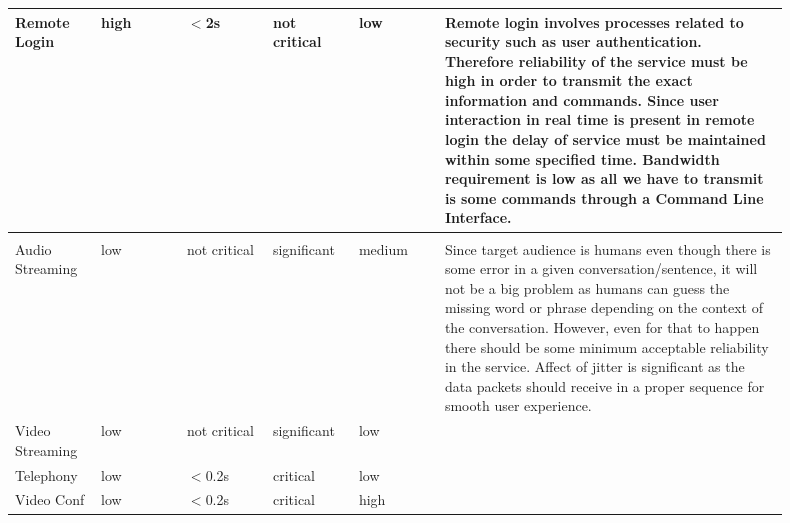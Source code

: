 \documentclass[a4paper,11pt]{article}
\begin{document}
\begin{landscape}
\begin{longtable}{p{0.1\linewidth} | p{0.1\linewidth} | p{0.1\linewidth} | p{0.1\linewidth} | p{0.1\linewidth} | p{0.4\linewidth} }
	Remote Login& high	& $<$2s & not critical & low & 
	Remote login involves  processes  related to security such as user authentication. Therefore reliability of the service must be high in order to transmit the exact information and commands. Since user interaction in real time is present in remote login the delay of service must be  maintained within some specified time. Bandwidth requirement is low as all we have to transmit is some commands through a Command Line Interface. \\\hline
	&&&&&\\
	
	Audio Streaming & low 	& not critical 	& significant & medium & Since target audience is humans even though there is some error in a given conversation/sentence, it will not be a big problem as humans can guess the missing word or phrase depending on the context of the conversation. However, even for that to happen there should be some minimum acceptable reliability in the service. Affect of jitter is significant as the data packets should receive in a proper sequence for smooth user experience.\\
	Video Streaming	& low	& not critical 	& significant & low & \\
	Telephony	& low   & $<$0.2s & critical & low & \\
	Video Conf	& low  & $<$0.2s & critical & high & \\

	\end{longtable}

\end{landscape}
\end{document}
